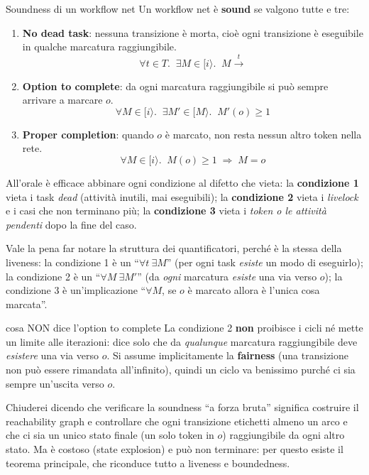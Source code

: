 \begin{definizione}{Soundness di un workflow net}
Un workflow net è \textbf{sound} se valgono tutte e tre:
\begin{enumerate}
  \item \textbf{No dead task}: nessuna transizione è morta, cioè ogni transizione è eseguibile in qualche marcatura raggiungibile.
  $$\forall t \in T.\;\; \exists M \in [i\rangle.\;\; M \xrightarrow{t}$$
  \item \textbf{Option to complete}: da ogni marcatura raggiungibile si può sempre arrivare a marcare $o$.
  $$\forall M \in [i\rangle.\;\; \exists M' \in [M\rangle.\;\; M'(o) \ge 1$$
  \item \textbf{Proper completion}: quando $o$ è marcato, non resta nessun altro token nella rete.
  $$\forall M \in [i\rangle.\;\; M(o) \ge 1 \;\Rightarrow\; M = o$$
\end{enumerate}
\end{definizione}

All'orale è efficace abbinare ogni condizione al difetto che vieta: la \textbf{condizione 1} vieta i task \emph{dead} (attività inutili, mai eseguibili); la \textbf{condizione 2} vieta i \emph{livelock} e i casi che non terminano più; la \textbf{condizione 3} vieta i \emph{token o le attività pendenti} dopo la fine del caso.

Vale la pena far notare la struttura dei quantificatori, perché è la stessa della liveness: la condizione 1 è un ``$\forall t\ \exists M$'' (per ogni task \emph{esiste} un modo di eseguirlo); la condizione 2 è un ``$\forall M\ \exists M'$'' (da \emph{ogni} marcatura \emph{esiste} una via verso $o$); la condizione 3 è un'implicazione ``$\forall M$, se $o$ è marcato allora è l'unica cosa marcata''.

\begin{attenzione}{cosa NON dice l'option to complete}
La condizione 2 \textbf{non} proibisce i cicli né mette un limite alle iterazioni: dice solo che da \emph{qualunque} marcatura raggiungibile deve \emph{esistere} una via verso $o$. Si assume implicitamente la \textbf{fairness} (una transizione non può essere rimandata all'infinito), quindi un ciclo va benissimo purché ci sia sempre un'uscita verso $o$.
\end{attenzione}

Chiuderei dicendo che verificare la soundness ``a forza bruta'' significa costruire il reachability graph e controllare che ogni transizione etichetti almeno un arco e che ci sia un unico stato finale (un solo token in $o$) raggiungibile da ogni altro stato. Ma è costoso (state explosion) e può non terminare: per questo esiste il teorema principale, che riconduce tutto a liveness e boundedness.

